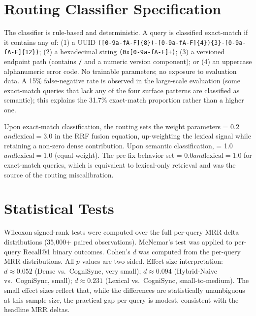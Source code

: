 \documentclass[sigconf,authordraft]{acmart}
\begin{document}
\section{Routing Classifier Specification}
\label{app:routing_spec}

The classifier is rule-based and deterministic. A query is classified
exact-match if it contains any of: (1) a UUID
\texttt{([0-9a-fA-F]\{8\}(-[0-9a-fA-F]\{4\})\{3\}-[0-9a-fA-F]\{12\})};
(2) a hexadecimal string \texttt{(0x[0-9a-fA-F]+)}; (3) a versioned
endpoint path (contains \texttt{/} and a numeric version component); or
(4) an uppercase alphanumeric error code. No trainable parameters; no
exposure to evaluation data. A 15\% false-negative rate is observed
in the large-scale evaluation (some exact-match queries that lack any of
the four surface patterns are classified as semantic); this explains the
31.7\% exact-match proportion rather than a higher one.

Upon exact-match classification, the routing sets the weight
parameters {} = 0.2$ and {\mathrm{lexical}} = 3.0$ in the RRF fusion equation, up-weighting the
lexical signal while retaining a non-zero dense contribution. Upon semantic
classification, {} = 1.0$ and {\mathrm{lexical}} = 1.0$ (equal-weight). The pre-fix behavior set
{} = 0.0$ and {\mathrm{lexical}} = 1.0$ for exact-match queries, which is equivalent to lexical-only
retrieval and was the source of the routing miscalibration.

\section{Statistical Tests}

Wilcoxon signed-rank tests were computed over the full per-query MRR delta
distributions (35,000+ paired observations). McNemar's test was applied to
per-query Recall@1 binary outcomes. Cohen's $d$ was computed from the
per-query MRR distributions. All $p$-values are two-sided.
Effect-size interpretation: $d \approx 0.052$ (Dense vs.~CogniSync, very
small); $d \approx 0.094$ (Hybrid-Naive vs.~CogniSync, small);
$d \approx 0.231$ (Lexical vs.~CogniSync, small-to-medium). The small
effect sizes reflect that, while the differences are statistically
unambiguous at this sample size, the practical gap per query is modest,
consistent with the headline MRR deltas.
\end{document}

